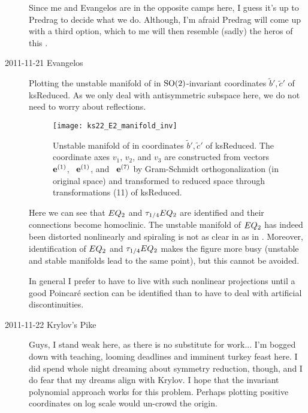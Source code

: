 \begin{description}
    Since me and Evangelos are in the opposite camps here, I guess it's
    up to Predrag to decide what we do.  Although, I'm afraid Predrag
    will come up with a third option, which to me will then resemble
    (sadly) the heros of this
    .

\item[2011-11-21 Evangelos] Plotting the unstable manifold of  in $\SOn{2}$-invariant
coordinates $\tilde{b}',\tilde{c}'$ of ksReduced. As we only deal with antisymmetric subspace
here, we do not need to worry about reflections.

\begin{figure}[ht]
 \begin{center}
  \texttt{[image: ks22\_E2\_manifold\_inv]}
 \end{center}
  \caption{Unstable manifold of  in coordinates $\tilde{b}',\tilde{c}'$ of ksReduced. The coordinate axes $v_1$,
$v_2$, and $v_3$ are constructed from vectors \Re\, $\jEigvec[1]$, \Im\, $\jEigvec[1]$, and {\Re\,} $\jEigvec[7]$
by Gram-Schmidt orthogonalization (in original space) and transformed to reduced space through transformations
(11) of ksReduced.
  }
\label{f:ks22_E2_inv}
\end{figure}

Here we can see that $\EQV{2}$ and $\tau_{1/4} \EQV{2}$ are identified and their
connections become homoclinic. The unstable manifold of $\EQV{2}$ has indeed been distorted
nonlinearly and spiraling is not as clear in  as in
. Moreover, identification of $\EQV{2}$ and $\tau_{1/4} \EQV{2}$
makes the figure more busy (unstable and stable manifolds lead to the same point), but this
cannot be avoided.

In general I prefer to have to live with such nonlinear projections until
a good Poincar\'e section can be identified than to have to deal with
artificial discontinuities.

\item[2011-11-22 Krylov's Pike] Guys, I stand weak here, as
there is no substitute for work... I'm bogged down with teaching, looming
deadlines and imminent turkey feast here. I did spend whole night
dreaming about symmetry reduction, though, and I do fear that my dreams
align with Krylov. I hope that the invariant polynomial approach works
for this problem. Perhaps plotting positive coordinates on log scale
would un-crowd the origin.


\end{description}
